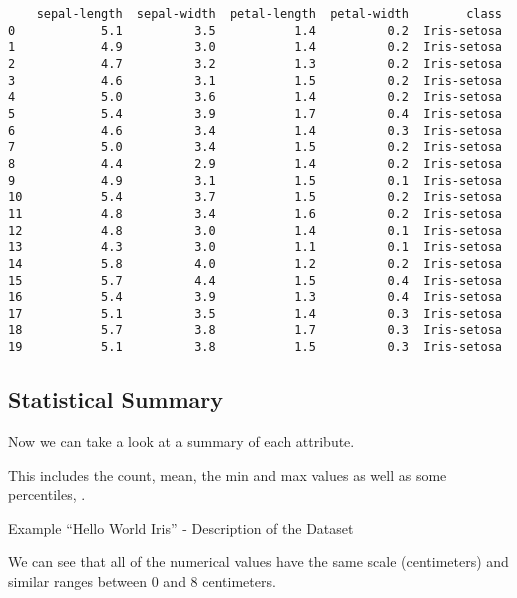 \begin{lstlisting}
    sepal-length  sepal-width  petal-length  petal-width        class
0            5.1          3.5           1.4          0.2  Iris-setosa
1            4.9          3.0           1.4          0.2  Iris-setosa
2            4.7          3.2           1.3          0.2  Iris-setosa
3            4.6          3.1           1.5          0.2  Iris-setosa
4            5.0          3.6           1.4          0.2  Iris-setosa
5            5.4          3.9           1.7          0.4  Iris-setosa
6            4.6          3.4           1.4          0.3  Iris-setosa
7            5.0          3.4           1.5          0.2  Iris-setosa
8            4.4          2.9           1.4          0.2  Iris-setosa
9            4.9          3.1           1.5          0.1  Iris-setosa
10           5.4          3.7           1.5          0.2  Iris-setosa
11           4.8          3.4           1.6          0.2  Iris-setosa
12           4.8          3.0           1.4          0.1  Iris-setosa
13           4.3          3.0           1.1          0.1  Iris-setosa
14           5.8          4.0           1.2          0.2  Iris-setosa
15           5.7          4.4           1.5          0.4  Iris-setosa
16           5.4          3.9           1.3          0.4  Iris-setosa
17           5.1          3.5           1.4          0.3  Iris-setosa
18           5.7          3.8           1.7          0.3  Iris-setosa
19           5.1          3.8           1.5          0.3  Iris-setosa
\end{lstlisting}
    
\subsection{Statistical Summary}

Now we can take a look at a summary of each attribute.
    
This includes the count, mean, the min and max values as well as some percentiles, .

\begin{code}
        
    
    \caption{Example ``Hello World Iris'' - Description of the Dataset} \label{HelloWorldIrisLoad4}
\end{code}      
    

 We can see that all of the numerical values have the same scale (centimeters) and similar ranges between 0 and 8 centimeters.
    
